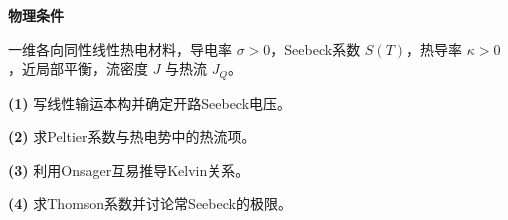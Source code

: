\textbf{物理条件}\par 一维各向同性线性热电材料，导电率 \(\sigma>0\)，Seebeck系数 \(S(T)\)，热导率 \(\kappa>0\)，近局部平衡，流密度 \(J\) 与热流 \(J_Q\)。
\par\noindent\textbf{(1)} 写线性输运本构并确定开路Seebeck电压。
\par\noindent\textbf{(2)} 求Peltier系数与热电势中的热流项。
\par\noindent\textbf{(3)} 利用Onsager互易推导Kelvin关系。
\par\noindent\textbf{(4)} 求Thomson系数并讨论常Seebeck的极限。

